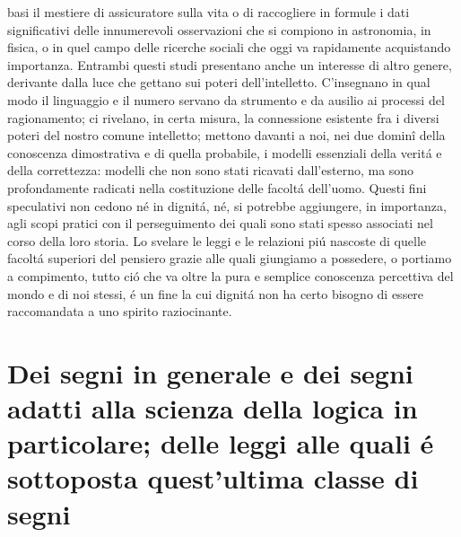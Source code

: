 \documentclass[a4paper,10pt]{book}
\begin{document}
basi il mestiere di assicuratore sulla vita o di raccogliere in formule i dati significativi delle innumerevoli osservazioni che si compiono in astronomia, in fisica, o in quel campo delle ricerche
sociali che oggi va rapidamente acquistando importanza. Entrambi questi studi presentano anche un interesse di altro genere, derivante dalla luce che gettano sui poteri dell'intelletto.
C'insegnano in qual modo il linguaggio e il numero servano da strumento e da ausilio ai processi del ragionamento; ci rivelano, in certa misura, la connessione esistente fra i diversi
poteri del nostro comune intelletto; mettono davanti a noi, nei due domin\^{i} della conoscenza dimostrativa e di quella probabile, i modelli essenziali della verit\'{a} e della
correttezza: modelli che non sono stati ricavati dall'esterno, ma sono profondamente radicati nella costituzione delle facolt\'{a} dell'uomo. Questi fini speculativi non cedono n\'{e}
in dignit\'{a}, n\'{e}, si potrebbe aggiungere, in importanza, agli scopi pratici con il perseguimento dei quali sono stati spesso associati nel corso della loro storia. Lo svelare le
leggi e le relazioni pi\'{u} nascoste di quelle facolt\'{a} superiori del pensiero grazie alle quali giungiamo a possedere, o portiamo a compimento, tutto ci\'{o} che va oltre la pura
e semplice conoscenza percettiva del mondo e di noi stessi, \'{e} un fine la cui dignit\'{a} non ha certo bisogno di essere raccomandata a uno spirito raziocinante.

\chapter{Dei segni in generale e dei segni adatti alla scienza della logica in particolare; delle leggi alle quali \'{e} sottoposta quest'ultima classe di segni}
\end{document}
